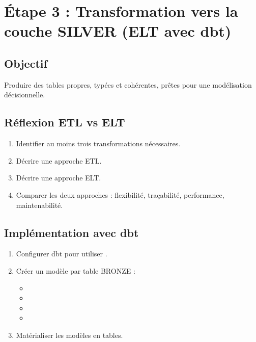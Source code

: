 \documentclass[11pt,a4paper]{article}
\begin{document}

\section{Étape 3 : Transformation vers la couche SILVER (ELT avec dbt)}

\subsection*{Objectif}

Produire des tables propres, typées et cohérentes,
prêtes pour une modélisation décisionnelle.

\subsection{Réflexion ETL vs ELT}

\begin{enumerate}
  \item Identifier au moins trois transformations nécessaires.
  \item Décrire une approche ETL.
  \item Décrire une approche ELT.
  \item Comparer les deux approches :
  flexibilité, traçabilité, performance, maintenabilité.
\end{enumerate}

\subsection{Implémentation avec dbt}

\begin{enumerate}
  \item Configurer dbt pour utiliser .
  \item Créer un modèle par table BRONZE :
  \begin{itemize}
    \item {}
    \item {}
    \item {}
    \item {}
  \end{itemize}
  \item Matérialiser les modèles en tables.
\end{enumerate}
\end{document}
